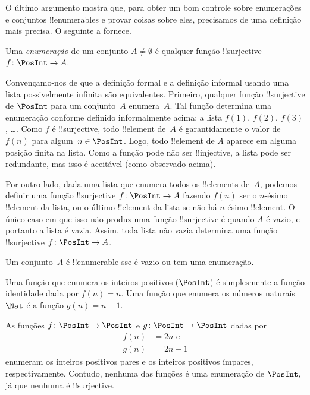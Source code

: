 \documentclass[../../../include/open-logic-section]{subfiles}
\begin{document}
O último argumento mostra que, para obter um bom controle sobre
enumerações e conjuntos !!{enumerable}s e provar coisas sobre eles,
precisamos de uma definição mais precisa. O seguinte a fornece.

\begin{defn}
Uma \emph{enumeração} de um conjunto $A \neq \emptyset$ é qualquer
função !!{surjective} $f \colon \PosInt \to A$.
\end{defn}

\begin{explain}
Convençamo-nos de que a definição formal e a definição informal
usando uma lista possivelmente infinita são equivalentes. Primeiro, qualquer
função !!{surjective} de $\PosInt$ para um conjunto~$A$ enumera~$A$.
Tal função determina uma enumeração conforme definido informalmente acima:
a lista $f(1)$, $f(2)$, $f(3)$, \dots. Como $f$ é !!{surjective},
todo !!{element} de~$A$ é garantidamente o valor de~$f(n)$ para
algum~$n \in \PosInt$. Logo, todo !!{element} de $A$ aparece em alguma
posição finita na lista. Como a função pode não ser
!!{injective}, a lista pode ser redundante, mas isso é aceitável (como
observado acima).

Por outro lado, dada uma lista que enumera todos os !!{element}s
de~$A$, podemos definir uma função !!{surjective} $f\colon \PosInt \to A$
fazendo $f(n)$ ser o $n$-ésimo !!{element} da lista, ou o último
!!{element} da lista se não há $n$-ésimo !!{element}. O único
caso em que isso não produz uma função !!{surjective} é quando $A$ é
vazio, e portanto a lista é vazia. Assim, toda lista não vazia
determina uma função !!{surjective} $f\colon \PosInt \to A$.
\end{explain}

\begin{defn}
  Um conjunto~$A$ é !!{enumerable} sse é vazio ou tem uma enumeração.
\end{defn}

\begin{ex}
Uma função que enumera os inteiros positivos ($\PosInt$) é simplesmente a
função identidade dada por $f(n) = n$. Uma função que enumera os
números naturais $\Nat$ é a função $g(n) = n - 1$.
\end{ex}

\begin{ex}
As funções $f\colon \PosInt \to \PosInt$ e $g \colon \PosInt \to
\PosInt$ dadas por
\begin{align*}
f(n) & = 2n \text{ e}\\
g(n) & = 2n - 1
\end{align*}
enumeram os inteiros positivos pares e os inteiros positivos ímpares,
respectivamente. Contudo, nenhuma das funções é uma enumeração de
$\PosInt$, já que nenhuma é !!{surjective}.
\end{ex}
\end{document}
